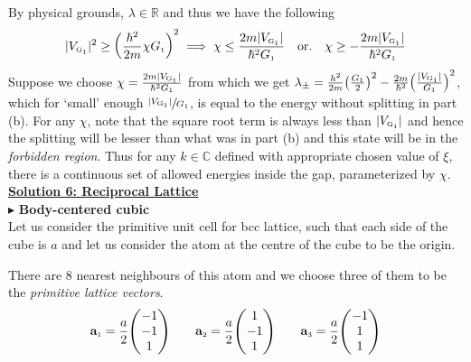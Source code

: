 \documentclass[usenames, svgnames, dvipsnames]{scrartcl}
\newcommand{\tund}[1]{_{\text{\tiny #1}}}
\begin{document}
By physical grounds, $\lambda\in \mathbb{R}$ and thus we have the following $$|V\tund{G\textsubscript{1}}|^2 \geq \qty(\frac{\hbar^2}{2m}\chi G\tund{1})^2\implies \chi \leq \frac{2m|V\tund{G\textsubscript{1}}|}{\hbar^2 G\tund{1}}\quad \text{or.}\quad \chi \geq -\frac{2 m|V\tund{G\textsubscript{1}}|}{\hbar^2 G\tund{1}}$$
Suppose we choose $\chi = \frac{2m|V\tund{G\textsubscript{1}}|}{\hbar^2 G\tund{1}}$ from which we get  $\lambda_{\pm} = \frac{h^2}{2m}\qty(\frac{G\tund{1}}{2})^2 -\frac{2m}{\hbar^2} \qty(\frac{ |V\tund{G\textsubscript{1}}|}{ G\tund{1}})^2$, which for `small' enough $\sfrac{|V\tund{G\textsubscript{1}}|}{G\tund{1}}$, is equal to the energy without splitting in part (b). For any $\chi$, note that the square root term is always less than $|V\tund{G\textsubscript{1}}|$ and hence the splitting will be lesser than what was in part (b) and this state will be in the \textit{forbidden region}. Thus for any $k\in \mathbb{C}$ defined with appropriate chosen value of $\xi$, there is a continuous set of allowed energies inside the gap, parameterized by $\chi$.\\[0.2cm]
\noindent
\underline{\textbf{{\sffamily Solution 6: Reciprocal Lattice}}}
\\[0.4cm]
$\blacktriangleright$ \textbf{Body-centered cubic}\\[0.2cm]
Let us consider the primitive unit cell for bcc lattice, such that each side of the cube is $a$ and let us consider the atom at the centre of the cube to be the origin.
\begin{figure}[H]
    \centering 
    
\end{figure}
\noindent
There are $8$ nearest neighbours of this atom and we choose three of them to be the \textit{primitive lattice vectors}. 
$$\vb{a}\tund{1} = \frac{a}{2}\mqty(-1\\ -1\\1)\qquad \vb{a}\tund{2} = \frac{a}{2}\mqty(1\\ -1\\1) \qquad \vb{a}\tund{3} = \frac{a}{2}\mqty(-1\\ 1\\1)$$ 
\end{document}
